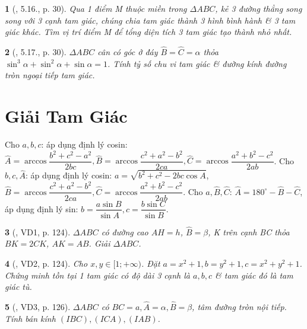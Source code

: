 \documentclass{article}
\newtheorem{baitoan}{}
\begin{document}
\begin{baitoan}[\cite{Hai_Hung_Thu_Tung2022_tap_1}, 5.16., p. 30]
	Qua 1 điểm M thuộc miền trong $\Delta ABC$, kẻ 3 đường thẳng song song với 3 cạnh tam giác, chúng chia tam giác thành 3 hình bình hành \& 3 tam giác khác. Tìm vị trí điểm M để tổng diện tích 3 tam giác tạo thành nhỏ nhất.
\end{baitoan}

\begin{baitoan}[\cite{Hai_Hung_Thu_Tung2022_tap_1}, 5.17., p. 30]
	$\Delta ABC$ cân có góc ở đáy $\widehat{B} = \widehat{C} = \alpha$ thỏa $\sin^3\alpha + \sin^2\alpha + \sin\alpha = 1$. Tính tỷ số chu vi tam giác \& đường kính đường tròn ngoại tiếp tam giác.
\end{baitoan}


\section{Giải Tam Giác}
 Cho $a,b,c$: áp dụng định lý cosin: $\widehat{A} = \arccos\dfrac{b^2 + c^2 - a^2}{2bc},\widehat{B} = \arccos\dfrac{c^2 + a^2 - b^2}{2ca},\widehat{C} = \arccos\dfrac{a^2 + b^2 - c^2}{2ab}$.  Cho $b,c,\widehat{A}$: áp dụng định lý cosin: $a = \sqrt{b^2 + c^2 - 2bc\cos A}$, $\widehat{B} = \arccos\dfrac{c^2 + a^2 - b^2}{2ca},\widehat{C} = \arccos\dfrac{a^2 + b^2 - c^2}{2ab}$.  Cho $a,\widehat{B},\widehat{C}$: $\widehat{A} = 180^\circ - \widehat{B} - \widehat{C}$, áp dụng định lý sin: $b = \dfrac{a\sin B}{\sin A},c = \dfrac{b\sin C}{\sin B}$.

\begin{baitoan}[\cite{TLCT_hinh_hoc_10}, VD1, p. 124]
	$\Delta ABC$ có đường cao $AH = h$, $\widehat{B} = \beta$, K trên cạnh BC thỏa $BK = 2CK$, $AK = AB$. Giải $\Delta ABC$.
\end{baitoan}

\begin{baitoan}[\cite{TLCT_hinh_hoc_10}, VD2, p. 124]
	Cho $x,y\in[1;+\infty)$. Đặt $a = x^2 + 1,b = y^2 + 1,c = x^2 + y^2 + 1$. Chứng minh tồn tại 1 tam giác có độ dài 3 cạnh là $a,b,c$ \& tam giác đó là tam giác tù.
\end{baitoan}

\begin{baitoan}[\cite{TLCT_hinh_hoc_10}, VD3, p. 126]
	$\Delta ABC$ có $BC = a,\widehat{A} = \alpha,\widehat{B} = \beta$, tâm đường tròn nội tiếp. Tính bán kính $(IBC),(ICA),(IAB)$.
\end{baitoan}
\end{document}

